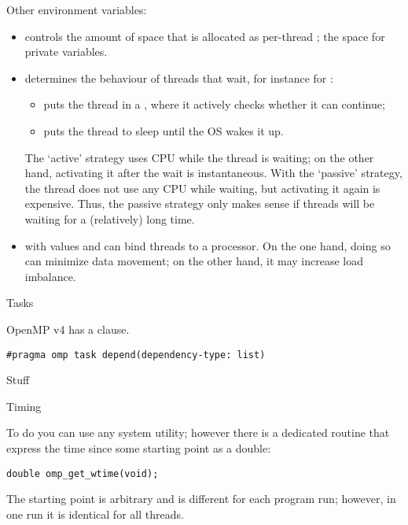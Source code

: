 Other environment variables:
\begin{itemize}
\item {} controls the amount of space that is
  allocated as per-thread ; the space for private
  variables.
\item {} determines the behaviour of
  threads that wait, for instance for :
  \begin{itemize}
  \item {} puts the thread in a , where
    it actively checks whether it can continue;
  \item {} puts the thread to sleep until the \ac{OS} wakes
    it up.
  \end{itemize}
  The `active' strategy uses CPU while the thread is waiting; on the
  other hand, activating it after the wait is instantaneous. With the
  `passive' strategy, the thread does not use any CPU while waiting,
  but activating it again is expensive. Thus, the passive strategy
  only makes sense if threads will be waiting for a (relatively) long
  time.
\item {} with values  and 
  can bind threads to a processor. On the one hand, doing so can
  minimize data movement; on the other hand, it may increase load
  imbalance.
\end{itemize}


 {Tasks}

OpenMP v4 has a  clause.
\begin{verbatim}
#pragma omp task depend(dependency-type: list)
\end{verbatim}

 {Stuff}

 {Timing}

To do  you can use any system utility;
however there is a dedicated routine 
that express the time since some starting point as a double:
\begin{verbatim}
double omp_get_wtime(void);
\end{verbatim}
The starting point is arbitrary and is different for each program run;
however, in one run it is identical for all threads.

